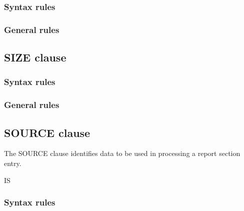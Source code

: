 \subsubsection{Syntax rules}

\subsubsection{General rules}

\subsection{SIZE clause}

\begin{syntax}[\miscextcolour]
\end{syntax}

\subsubsection{Syntax rules}

\subsubsection{General rules}

\subsection{SOURCE clause}

The SOURCE clause identifies data to be used in processing a report section entry.

\begin{syntax}
   IS 
  \begin{0-1}
  \end{0-1}
\end{syntax}

\subsubsection{Syntax rules}

